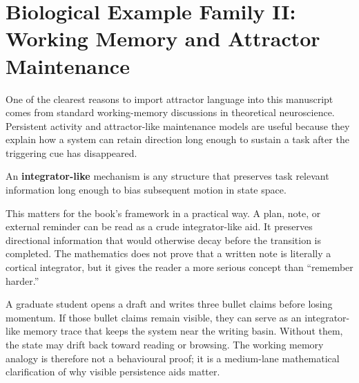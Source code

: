 \section{Biological Example Family II: Working Memory and Attractor Maintenance}

One of the clearest reasons to import attractor language into this manuscript
comes from standard working-memory discussions in theoretical neuroscience.
Persistent activity and attractor-like maintenance models are useful because
they explain how a system can retain direction long enough to sustain a task
after the triggering cue has disappeared.

\begin{definition}
An \textbf{integrator-like} mechanism is any structure that preserves task
relevant information long enough to bias subsequent motion in state space.
\end{definition}

\begin{discussion}
This matters for the book's framework in a practical way. A plan, note, or
external reminder can be read as a crude integrator-like aid. It preserves
directional information that would otherwise decay before the transition is
completed. The mathematics does not prove that a written note is literally a
cortical integrator, but it gives the reader a more serious concept than
``remember harder.''
\end{discussion}

\begin{example}
A graduate student opens a draft and writes three bullet claims before losing
momentum. If those bullet claims remain visible, they can serve as an
integrator-like memory trace that keeps the system near the writing basin.
Without them, the state may drift back toward reading or browsing. The working
memory analogy is therefore not a behavioural proof; it is a medium-lane
mathematical clarification of why visible persistence aids matter.
\end{example}
